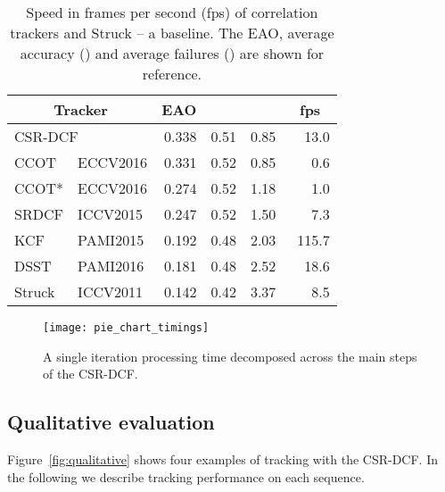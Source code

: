 \documentclass[twocolumn]{article}
\newcommand*\circledd[1]{\tikz[baseline=(char.base)]{
            \node[shape=circle,draw,inner sep=0.15pt] (char) {#1};}}
\newcommand{\first}[1]{{\raisebox{0.8pt}{\footnotesize \color{gold} \circledd{1}}\hspace{3.5pt}#1}}
\newcommand{\second}[1]{{\raisebox{0.8pt}{\footnotesize \color{silver} \circledd{2}}\hspace{3.5pt}#1}}
\newcommand{\third}[1]{{\raisebox{0.8pt}{\footnotesize \color{bronze} \circledd{3}}\hspace{3.5pt}#1}}
\newcommand{\first}[1]{\bf{\color{red}#1}}
\newcommand{\second}[1]{\em{\color{blue}#1}}
\newcommand{\third}[1]{{\color{green}#1}}
\begin{document}
\begin{table}[!t]\setlength{\tabcolsep}{4pt}
\begin{center}
\caption{Speed in frames per second (fps) of correlation trackers and Struck -- a baseline. The EAO, average accuracy () and average failures () are shown for reference.}
\label{tab:real-time}
\begin{tabular*}{1\linewidth}{l l r r r r}\hline
 \multicolumn{2}{c}{Tracker} & \multicolumn{1}{c}{EAO} & \multicolumn{1}{c}{} & \multicolumn{1}{c}{} & \multicolumn{1}{c}{fps} \\
\hline
\multicolumn{2}{l}{CSR-DCF} & \first{0.338} & \second{0.51} & \first{0.85} & \third{~~13.0} \\
CCOT & \tiny{ECCV2016} & \second{0.331} & \first{0.52} & \first{0.85} & 0.6 \\ 
CCOT* & \tiny{ECCV2016} & \third{0.274} & \first{0.52} & \second{1.18} & 1.0 \\
SRDCF & \tiny{ICCV2015} & 0.247 & \first{0.52} & \third{1.50} & 7.3 \\
KCF & \tiny{PAMI2015} & 0.192 & \third{0.48} & 2.03 & \first{115.7} \\
DSST & \tiny{PAMI2016} & 0.181 & \third{0.48} & 2.52 & \second{~~18.6} \\
Struck & \tiny{ICCV2011} & 0.142 & 0.42 & 3.37 & 8.5 \\
\hline
\end{tabular*}
\end{center}
\end{table}

\begin{figure}[!t]
\centering
\texttt{[image: pie\_chart\_timings]}
\caption{A single iteration processing time decomposed across the main steps of the CSR-DCF.}
\label{fig:time_pie_chart}
\end{figure}

\subsection{Qualitative evaluation} \label{sec:qualitative}

Figure~\ref{fig:qualitative} shows four examples of tracking with the  CSR-DCF. In the following we describe tracking performance on each sequence.
\end{document}
